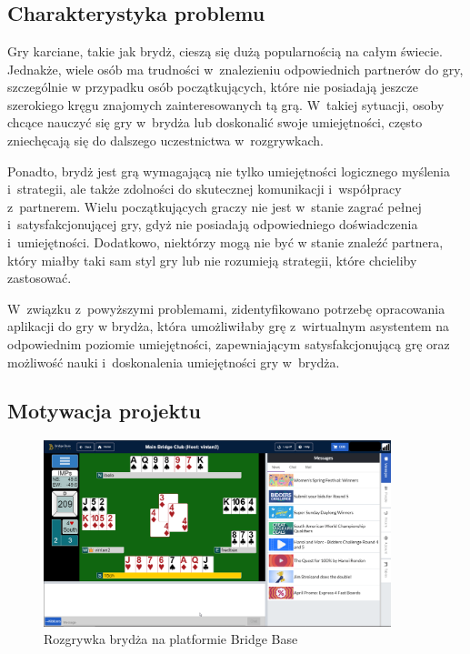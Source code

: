 \chapter{\ChapterTitleProjectVision}
\label{sec:cel-wizja}


\section{Charakterystyka problemu}

Gry karciane, takie jak brydż, cieszą się dużą popularnością na całym świecie.
Jednakże, wiele osób ma trudności w~znalezieniu odpowiednich partnerów do gry,
szczególnie w przypadku osób początkujących, które nie posiadają jeszcze
szerokiego kręgu znajomych zainteresowanych tą grą. W~takiej sytuacji, osoby
chcące nauczyć się gry w~brydża lub doskonalić swoje umiejętności, często
zniechęcają się do dalszego uczestnictwa w~rozgrywkach.

Ponadto, brydż jest grą wymagającą nie tylko umiejętności logicznego myślenia
i~strategii, ale także zdolności do skutecznej komunikacji i~współpracy
z~partnerem. Wielu początkujących graczy nie jest w~stanie zagrać pełnej
i~satysfakcjonującej gry, gdyż nie posiadają odpowiedniego doświadczenia
i~umiejętności. Dodatkowo, niektórzy mogą nie być w stanie znaleźć
partnera, który miałby taki sam styl gry lub nie rozumieją strategii,
które chcieliby zastosować.

W~związku z~powyższymi problemami, zidentyfikowano potrzebę opracowania
aplikacji do gry w brydża, która umożliwiłaby grę z~wirtualnym asystentem
na odpowiednim poziomie umiejętności, zapewniającym satysfakcjonującą
grę oraz możliwość nauki i~doskonalenia umiejętności gry w~brydża.


\section{Motywacja projektu}

\begin{figure}
  \centering
  \includegraphics[width=0.9\textwidth]{img/brydz-platformy/bridgebase.png}
  \caption{Rozgrywka brydża na platformie Bridge Base}
  \label{fig:bridge-base}
\end{figure}

